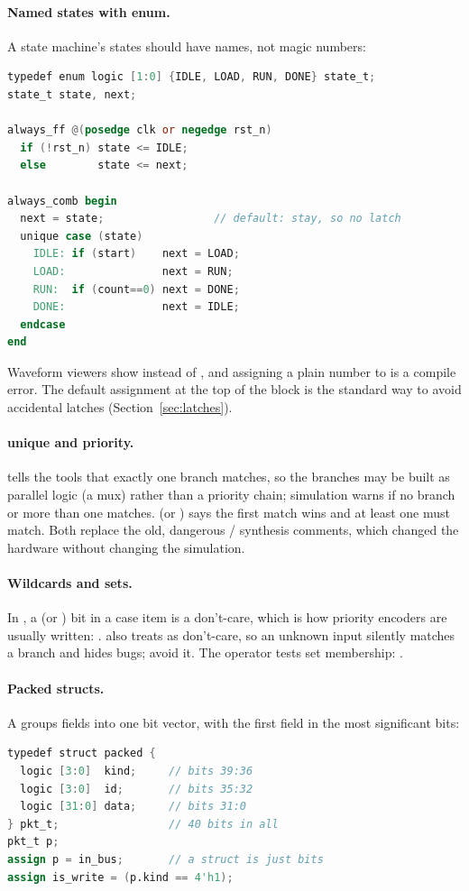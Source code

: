 \paragraph{Named states with enum.} A state machine's states should have names, not magic numbers:
\begin{lstlisting}[language=Verilog]
typedef enum logic [1:0] {IDLE, LOAD, RUN, DONE} state_t;
state_t state, next;

always_ff @(posedge clk or negedge rst_n)
  if (!rst_n) state <= IDLE;
  else        state <= next;

always_comb begin
  next = state;                 // default: stay, so no latch
  unique case (state)
    IDLE: if (start)    next = LOAD;
    LOAD:               next = RUN;
    RUN:  if (count==0) next = DONE;
    DONE:               next = IDLE;
  endcase
end
\end{lstlisting}
Waveform viewers show  instead of , and assigning a plain number to  is a compile error. The default assignment  at the top of the block is the standard way to avoid accidental latches (Section~\ref{sec:latches}).

\paragraph{unique and priority.}  tells the tools that exactly one branch matches, so the branches may be built as parallel logic (a mux) rather than a priority chain; simulation warns if no branch or more than one matches.  (or ) says the first match wins and at least one must match. Both replace the old, dangerous / synthesis comments, which changed the hardware without changing the simulation.

\paragraph{Wildcards and sets.} In , a  (or ) bit in a case item is a don't-care, which is how priority encoders are usually written: .  also treats  as don't-care, so an unknown input silently matches a branch and hides bugs; avoid it. The  operator tests set membership: .

\paragraph{Packed structs.} A  groups fields into one bit vector, with the first field in the most significant bits:
\begin{lstlisting}[language=Verilog]
typedef struct packed {
  logic [3:0]  kind;     // bits 39:36
  logic [3:0]  id;       // bits 35:32
  logic [31:0] data;     // bits 31:0
} pkt_t;                 // 40 bits in all
pkt_t p;
assign p = in_bus;       // a struct is just bits
assign is_write = (p.kind == 4'h1);
\end{lstlisting}

